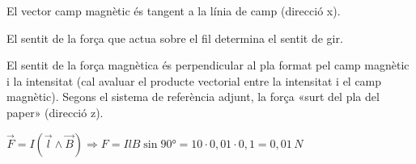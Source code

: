 \begin{solapartat}
\begin{minipage}[t]{0.5\linewidth}
\vspace{0pt}
\end{minipage}\hfill
\begin{minipage}[t]{0.46\linewidth}
\vspace{0pt}
El vector camp magnètic és tangent a la línia de camp (direcció x). 
\end{minipage}

\medskip
El sentit de la força que actua sobre el fil determina el sentit de gir. 

El sentit de la força magnètica és perpendicular al pla format pel camp magnètic i la intensitat (cal avaluar el producte vectorial entre la intensitat i el camp magnètic). Segons el sistema de referència adjunt, la força «surt del pla del paper» (direcció z). 
\end{solapartat}

\begin{solapartat}
 $\vec{F} = I\left(\vec{l}\wedge\vec{B}\right) \Rightarrow F = IlB\sin 90° = 10\cdot 0,01\cdot 0,1 = 0,01\,N$\quad {}
\end{solapartat}
